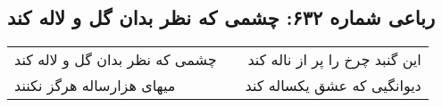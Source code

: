 \begin{center}
\section*{رباعی شماره ۶۳۲: چشمی که نظر بدان گل و لاله کند}
\label{sec:0632}
\begin{longtable}{l p{0.5cm} r}
چشمی که نظر بدان گل و لاله کند
&&
این گنبد چرخ را پر از ناله کند
\\
میهای هزارساله هرگز نکنند
&&
دیوانگیی که عشق یکساله کند
\\
\end{longtable}
\end{center}
